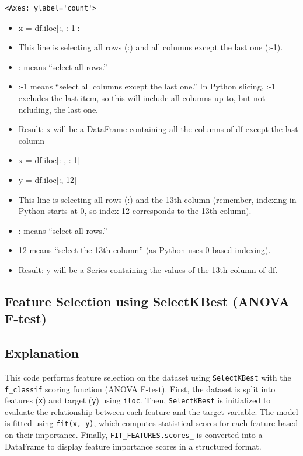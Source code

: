 \documentclass[11pt]{article}
\makeatletter
\providecommand{\tightlist}{%
      \setlength{\itemsep}{0pt}\setlength{\parskip}{0pt}}
\newcommand{\boxspacing}{\kern\kvtcb@left@rule\kern\kvtcb@boxsep}
\newcommand{\prompt}[4]{
        {\ttfamily\llap{{\color{#2}[#3]:\hspace{3pt}#4}}\vspace{-\baselineskip}}
    }
\makeatother
\begin{document}
            \begin{tcolorbox}[breakable, size=fbox, boxrule=.5pt, pad at break*=1mm, opacityfill=0]
\prompt{Out}{outcolor}{66}{\boxspacing}
\begin{Verbatim}[commandchars=\\\{\}]
<Axes: ylabel='count'>
\end{Verbatim}
\end{tcolorbox}
        
    \begin{center}
    \end{center}
    
    \begin{itemize}
\tightlist
\item
  x = df.iloc{[}:, :-1{]}:
\item
  This line is selecting all rows (:) and all columns except the last
  one (:-1).
\item
  : means ``select all rows.''
\item
  :-1 means ``select all columns except the last one.'' In Python
  slicing, :-1 excludes the last item, so this will include all columns
  up to, but not ncluding, the last one.
\item
  Result: x will be a DataFrame containing all the columns of df except
  the last column
  
\item
  x = df.iloc[: , :-1]
\item
  y = df.iloc{[}:, 12{]}
\item
  This line is selecting all rows (:) and the 13th column (remember,
  indexing in Python starts at 0, so index 12 corresponds to the 13th
  column).
\item
  : means ``select all rows.''
\item
  12 means ``select the 13th column'' (as Python uses 0-based indexing).
\item
  Result: y will be a Series containing the values of the 13th column of
  df.
\end{itemize}


\subsection{Feature Selection using SelectKBest (ANOVA F-test)}
\subsection*{Explanation}
This code performs feature selection on the dataset using \texttt{SelectKBest} with the \texttt{f\_classif} scoring function (ANOVA F-test). First, the dataset is split into features (\texttt{x}) and target (\texttt{y}) using \texttt{iloc}. Then, \texttt{SelectKBest} is initialized to evaluate the relationship between each feature and the target variable. The model is fitted using \texttt{fit(x, y)}, which computes statistical scores for each feature based on their importance. Finally, \texttt{FIT\_FEATURES.scores\_} is converted into a DataFrame to display feature importance scores in a structured format.
\end{document}
